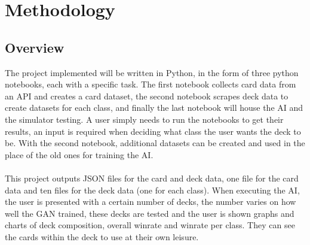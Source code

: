 \documentclass{report} %
\renewcommand{\labelenumi}{\alph{enumi}.} %
\begin{document}
\chapter{Methodology}
	\section{Overview}
	The project implemented will be written in Python, in the form of three python notebooks, each with a specific task. The first notebook collects card data from an API and creates a card dataset, the second notebook scrapes deck data to create datasets for each class, and finally the last notebook will house the AI and the simulator testing. A user simply needs to run the notebooks to get their results, an input is required when deciding what class the user wants the deck to be. With the second notebook, additional datasets can be created and used in the place of the old ones for training the AI. \\ \\
	This project outputs JSON files for the card and deck data, one file for the card data and ten files for the deck data (one for each class). When executing the AI, the user is presented with a certain number of decks, the number varies on how well the GAN trained, these decks are tested and the user is shown graphs and charts of deck composition, overall winrate and winrate per class. They can see the cards within the deck to use at their own leisure.
	
\end{document}
